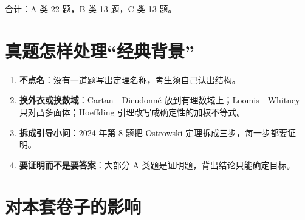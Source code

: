 \documentclass[cjk=noto, nomargin]{mojing-notes}
\begin{document}
合计：A 类 22 题，B 类 13 题，C 类 13 题。

\section{真题怎样处理“经典背景”}

\begin{enumerate}
  \item \textbf{不点名}：没有一道题写出定理名称，考生须自己认出结构。
  \item \textbf{换外衣或换数域}：Cartan—Dieudonné 放到有理数域上；Loomis—Whitney 只对凸多面体；Hoeffding 引理改写成确定性的加权不等式。
  \item \textbf{拆成引导小问}：2024 年第 8 题把 Ostrowski 定理拆成三步，每一步都要证明。
  \item \textbf{要证明而不是要答案}：大部分 A 类题是证明题，背出结论只能确定目标。
\end{enumerate}

\section{对本套卷子的影响}
\end{document}
